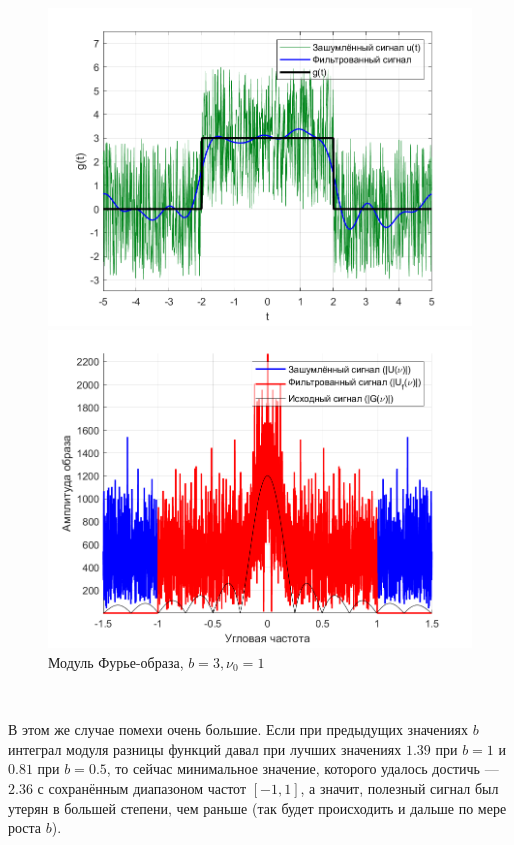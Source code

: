 \documentclass[a4paper]{article}
\begin{document}
\begin{figure}[H]
    \begin{minipage}{0.5\textwidth}
        \centering
        \includegraphics[width=\textwidth]{part1/3_1.png}
        \caption{$b=3, \nu_0 = 1$}
    \end{minipage}    
    \begin{minipage}{0.5\textwidth}
        \centering
        \includegraphics[width=\textwidth]{part1/3_1_Fourier.png}
        \caption{Модуль Фурье-образа, $b=3, \nu_0 = 1$}
    \end{minipage}
\end{figure}\

В этом же случае помехи очень большие. Если при предыдущих значениях $b$ интеграл модуля разницы функций давал при лучших значениях $1.39$ при $b = 1$ и $0.81$ при $b = 0.5$, то сейчас минимальное значение, которого удалось достичь --- $2.36$ с сохранённым диапазоном частот $[-1, 1]$, а значит, полезный сигнал был утерян в большей степени, чем раньше (так будет происходить и дальше по мере роста $b$).\\
\end{document}
